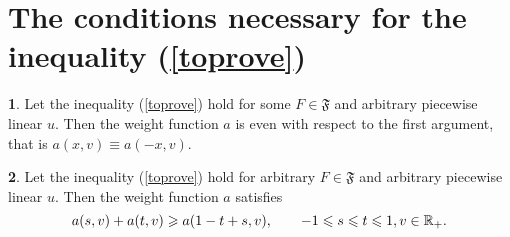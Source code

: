 \section{ The conditions necessary for the inequality (\ref{toprove})}

\begin{thm}
{\bf 1}. Let the inequality (\ref{toprove}) hold for some $F \in \mathfrak {F}$
and arbitrary piecewise linear $u$. Then the weight function $a$ is even with respect to the first argument,
that is $a(x, v) \equiv a(-x, v)$.

{\bf 2}. Let the inequality (\ref{toprove}) hold for arbitrary $F \in \mathfrak{F}$
and arbitrary piecewise linear $u$. Then the weight function $a$ satisfies
\begin{equation}
\label{almostConcave}
a(s, v) + a(t, v) \ge a(1 - t + s, v), \qquad -1 \le s \le t \le 1, v \in \Real_+.
\end{equation}
\end{thm}

